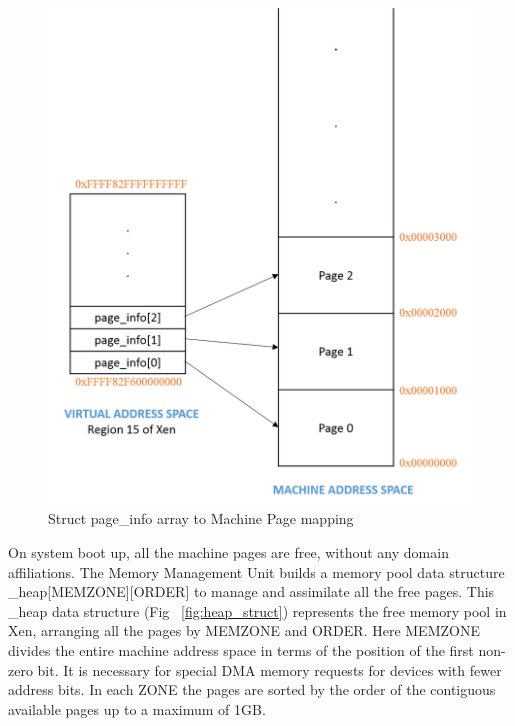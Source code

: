 \begin{figure}[H]
\centering
\includegraphics[scale=0.8]{figures/page_info.png}
\caption{Struct page\_info array to Machine Page mapping}
\label{fig:page_info_mapping}
\end{figure}

On system boot up, all the machine pages are free, without any domain affiliations. The Memory Management Unit builds a memory pool data structure \_heap[MEMZONE][ORDER] to manage and assimilate all the free pages. This \_heap data structure (Fig ~\ref{fig:heap_struct}) represents the free memory pool in Xen, arranging all the pages by MEMZONE and ORDER. Here MEMZONE divides the entire machine address space in terms of the position of the first non-zero bit. It is necessary for special DMA memory requests for devices with fewer address bits. In each ZONE the pages are sorted by the order of the contiguous available pages up to a maximum of 1GB. 


